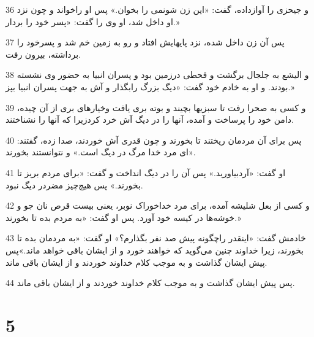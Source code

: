 \par 36 و جیحزی را آوازداده، گفت: «این زن شونمی را بخوان.» پس او راخواند و چون نزد او داخل شد، او وی را گفت: «پسر خود را بردار.»
\par 37 پس آن زن داخل شده، نزد پایهایش افتاد و رو به زمین خم شد و پسرخود را برداشته، بیرون رفت.
\par 38 و الیشع به جلجال برگشت و قحطی درزمین بود و پسران انبیا به حضور وی نشسته بودند. و او به خادم خود گفت: «دیگ بزرگ رابگذار و آش به جهت پسران انبیا بپز.»
\par 39 و کسی به صحرا رفت تا سبزیها بچیند و بوته بری یافت وخیارهای بری از آن چیده، دامن خود را پرساخت و آمده، آنها را در دیگ آش خرد کردزیرا که آنها را نشناختند.
\par 40 پس برای آن مردمان ریختند تا بخورند و چون قدری آش خوردند، صدا زده، گفتند: «ای مرد خدا مرگ در دیگ است.» و نتوانستند بخورند.
\par 41 او گفت: «آردبیاورید.» پس آن را در دیگ انداخت و گفت: «برای مردم بریز تا بخورند.» پس هیچ‌چیز مضردر دیگ نبود.
\par 42 و کسی از بعل شلیشه آمده، برای مرد خداخوراک نوبر، یعنی بیست قرص نان جو و خوشه‌ها در کیسه خود آورد. پس او گفت: «به مردم بده تا بخورند.»
\par 43 خادمش گفت: «اینقدر راچگونه پیش صد نفر بگذارم؟» او گفت: «به مردمان بده تا بخورند، زیرا خداوند چنین می‌گوید که خواهند خورد و از ایشان باقی خواهد ماند.»پس پیش ایشان گذاشت و به موجب کلام خداوند خوردند و از ایشان باقی ماند.
\par 44 پس پیش ایشان گذاشت و به موجب کلام خداوند خوردند و از ایشان باقی ماند.
 
\chapter{5}

